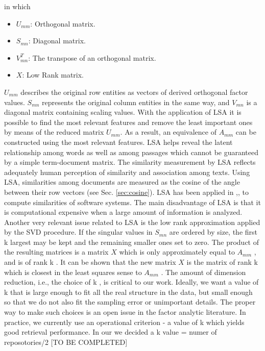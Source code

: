 in which

\begin{itemize}
	\item $U_{mm}$: Orthogonal matrix.
	\item $S_{mn}$: Diagonal matrix.
	\item $V_{mn}^{T}$: The transpose of an orthogonal matrix.
	\item $X$: Low Rank matrix.
\end{itemize}


$U_{mm}$ describes the original row entities as vectors of derived orthogonal factor values. $S_{mn}$ represents the original column entities in the same way, and $V_{mn}$ is a diagonal matrix containing scaling values. With the application of LSA it is possible to find the most relevant features and remove the least important ones by means of the reduced matrix $U_{mm}$. As a result, an equivalence of $A_{mm}$ can be constructed using the most relevant features. LSA helps reveal the latent relationship among words as well as among passages which cannot be guaranteed by a simple term-document matrix. The similarity measurement by LSA reflects adequately human perception of similarity and association among texts. Using LSA, similarities among documents are measured as the cosine of the angle between their row vectors (see Sec. \ref{sec:cosine}). LSA has been applied in \cite{10.1109/APSEC.2004.69},\cite{10.1109ICPC.2016.7503721},\cite{McMillan:2012:DSS:2337223.2337267} to compute similarities of software systems. The main disadvantage of LSA is that it is computational expensive when a large amount of information is analyzed.
Another very relevant issue related to LSA is the low rank approximation applied by the SVD procedure. If the singular values in $S_{mn}$ are ordered by size, the first k largest may be kept and the remaining smaller ones set to zero. The product of the resulting matrices is a matrix $X$ which is only approximately equal to $A_{mm}$ , and is of rank k . It can be shown that the new matrix $X$ is the matrix of rank k which is closest in the least squares sense to $A_{mm}$ .
The amount of dimension reduction, i.e., the choice of k , is critical to our work. Ideally, we want a value of k that is large enough to fit all the real structure in the data, but small enough so that we do not also fit the sampling error or unimportant details. The proper way to make such choices is an open issue in the factor analytic literature. In practice, we currently use an operational criterion - a
value of k which yields good retrieval performance. In our we decided a k value = numer of reposotories/2 [TO BE COMPLETED]
\newpage

